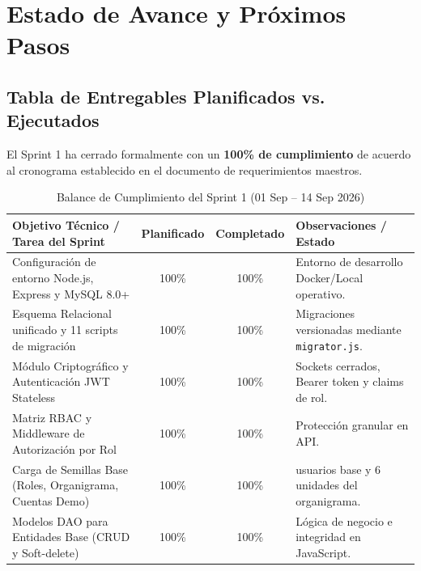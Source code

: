 \documentclass[a4paper,12pt]{article}
\begin{document}
\section{Estado de Avance y Próximos Pasos}

\subsection{Tabla de Entregables Planificados vs. Ejecutados}
El Sprint 1 ha cerrado formalmente con un \textbf{100\% de cumplimiento} de acuerdo al cronograma establecido en el documento de requerimientos maestros.

\begin{table}[H]
\centering
\small
\caption{Balance de Cumplimiento del Sprint 1 (01 Sep -- 14 Sep 2026)}
\label{tab:balance_sprint1}
\begin{tabularx}{\linewidth}{@{}Ycc>{\raggedright\arraybackslash}p{3.5cm}@{}}
\toprule
\textbf{Objetivo Técnico / Tarea del Sprint} & \textbf{Planificado} & \textbf{Completado} & \textbf{Observaciones / Estado} \\
\midrule
Configuración de entorno Node.js, Express y MySQL 8.0+ & 100\% & 100\% & Entorno de desarrollo Docker/Local operativo. \\
Esquema Relacional unificado y 11 scripts de migración & 100\% & 100\% & Migraciones versionadas mediante \texttt{migrator.js}. \\
Módulo Criptográfico y Autenticación JWT Stateless & 100\% & 100\% & Sockets cerrados, Bearer token y claims de rol. \\
Matriz RBAC y Middleware de Autorización por Rol & 100\% & 100\% & Protección granular en API. \\
Carga de Semillas Base (Roles, Organigrama, Cuentas Demo) & 100\% & 100\% & 3 usuarios base y 6 unidades del organigrama. \\
Modelos DAO para Entidades Base (CRUD y Soft-delete) & 100\% & 100\% & Lógica de negocio e integridad en JavaScript. \\
\bottomrule
\end{tabularx}
\end{table}
\end{document}
